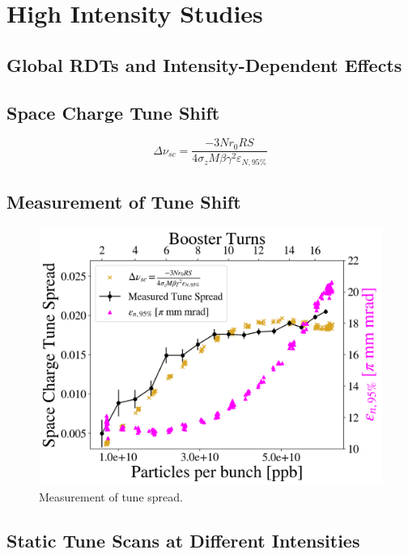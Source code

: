 \chapter{High Intensity Studies}
\label{sec:ch6}

\section{Global RDTs and Intensity-Dependent Effects}
\cite{mionrr}
\section{Space Charge Tune Shift}

\begin{equation}
    \Delta \nu_{sc}=\frac{-3 N r_0 R S}{4 \sigma_z M \beta \gamma ^2 \varepsilon_{N,95\%}}    
\end{equation}

\section{Measurement of Tune Shift}


\begin{figure}[H]
    \centering
    \includegraphics[width=\columnwidth]{chapter6/tune_spread.png}
    \caption{Measurement of tune spread.}
    \label{fig:tunespread}
\end{figure}

\section{Static Tune Scans at Different Intensities}

